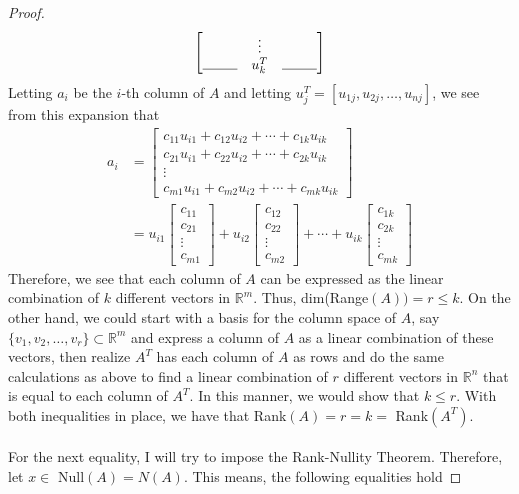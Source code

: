\documentclass[10pt,a4paper]{article}
\theoremstyle{definition}
\theoremstyle{definition}
\numberwithin{equation}{section}
\begin{document}
\begin{proof}
\begin{align*}
\begin{bmatrix}
& \vdots\\
\line(1,0){25} & u_k^T & \line(1,0){25}
\end{bmatrix}
\end{align*}
Letting $a_i$ be the $i$-th column of $A$ and letting $u_j^T = [u_{1j}, u_{2j}, \ldots, u_{nj}]$, we see from this expansion that 
\begin{align*}
a_i &= \begin{bmatrix}
c_{11}u_{i1} + c_{12}u_{i2} + \cdots + c_{1k}u_{ik}\\
c_{21}u_{i1} + c_{22}u_{i2} + \cdots + c_{2k}u_{ik}\\
\vdots\\
c_{m1}u_{i1} + c_{m2}u_{i2} + \cdots + c_{mk}u_{ik}
\end{bmatrix}\\
&= u_{i1} \begin{bmatrix}
c_{11}\\c_{21}\\ \vdots \\c_{m1}
\end{bmatrix} + u_{i2} \begin{bmatrix}
c_{12}\\c_{22}\\ \vdots \\c_{m2}
\end{bmatrix} + \cdots + u_{ik} \begin{bmatrix}
c_{1k}\\c_{2k}\\ \vdots \\c_{mk}
\end{bmatrix}
\end{align*}
Therefore, we see that each column of $A$ can be expressed as the linear combination of $k$ different vectors in $\mathbb{R}^m$. Thus, dim(Range$(A)) = r \leq k$. On the other hand, we could start with a basis for the column space of $A$, say $\{v_1, v_2, \ldots, v_r\} \subset \mathbb{R}^m$ and express a column of $A$ as a linear combination of these vectors, then realize $A^T$ has each column of $A$ as rows and do the same calculations as above to find a linear combination of $r$ different vectors in $\mathbb{R}^n$ that is equal to each column of $A^T$. In this manner, we would show that $k \leq r$. With both inequalities in place, we have that Rank$(A) = r = k = $ Rank$(A^T)$. 
\\
\\For the next equality, I will try to impose the Rank-Nullity Theorem. Therefore, let $x \in $ Null$(A) = N(A)$. This means, the following equalities hold

\end{proof}
\end{document}
